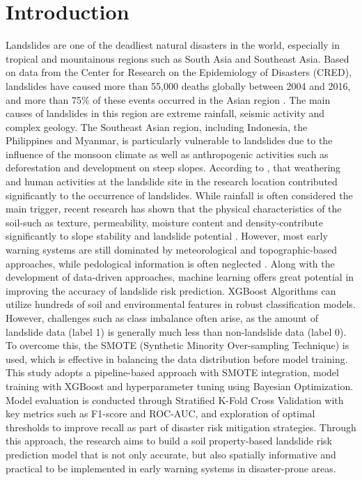 \section{Introduction}
Landslides are one of the deadliest natural disasters in the world, especially in tropical and mountainous regions such as South Asia and Southeast Asia. Based on data from the Center for Research on the Epidemiology of Disasters (CRED), landslides have caused more than 55,000 deaths globally between 2004 and 2016, and more than 75\% of these events occurred in the Asian region \cite{intro01}. The main causes of landslides in this region are extreme rainfall, seismic activity and complex geology.
The Southeast Asian region, including Indonesia, the Philippines and Myanmar, is particularly vulnerable to landslides due to the influence of the monsoon climate as well as anthropogenic activities such as deforestation and development on steep slopes. According to \cite{intro02},  that weathering and human activities at the landslide site in the research location contributed significantly to the occurrence of landslides.
While rainfall is often considered the main trigger, recent research has shown that the physical characteristics of the soil-such as texture, permeability, moisture content and density-contribute significantly to slope stability and landslide potential \cite{intro03}. However, most early warning systems are still dominated by meteorological and topographic-based approaches, while pedological information is often neglected \cite{intro04}.
Along with the development of data-driven approaches, machine learning offers great potential in improving the accuracy of landslide risk prediction. XGBoost Algorithms can utilize hundreds of soil and environmental features in robust classification models. However, challenges such as class imbalance often arise, as the amount of landslide data (label 1) is generally much less than non-landslide data (label 0). To overcome this, the SMOTE (Synthetic Minority Over-sampling Technique) is used, which is effective in balancing the data distribution before model training.
This study adopts a pipeline-based approach with SMOTE integration, model training with XGBoost and hyperparameter tuning using Bayesian Optimization. Model evaluation is conducted through Stratified K-Fold Cross Validation with key metrics such as F1-score and ROC-AUC, and exploration of optimal thresholds to improve recall as part of disaster risk mitigation strategies.
Through this approach, the research aims to build a soil property-based landslide risk prediction model that is not only accurate, but also spatially informative and practical to be implemented in early warning systems in disaster-prone areas.